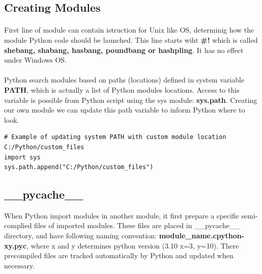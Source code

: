 \documentclass{article}
\begin{document}
\subsection{Creating Modules}
\paragraph{}
First line of module can contain istruction for Unix like OS, determinig how the module Python code should be launched. This line starts wiht \textbf{\#!} which is called \textbf{shebang, shabang, hasbang, poundbang or hashpling}. It has no effect under Windows OS.
\paragraph{}
Python search modules based on paths (locations) defined in system variable \textbf{PATH}, which is actually a list of Python modules locations. Access to this variable is possible from Python script using the sys module: \textbf{sys.path}. Creating our own module we can update this path variable to inform Python where to look.
\begin{lstlisting}[style=pystyle]
# Example of updating system PATH with custom module location C:/Python/custom_files
import sys
sys.path.append("C:/Python/custom_files") 
\end{lstlisting}


\subsection{\_\_pycache\_\_}
When Python import modules in another module, it first prepare a specific semi-complied files of imported modules. These files are placed in \_\_pycache\_\_ directory, and have following naming convention: \textbf{module\_name.cpython-xy.pyc}, where x and y determines python version (3.10 x=3, y=10). There precompiled files are tracked automatically by Python and updated when necessary.  
\end{document}
